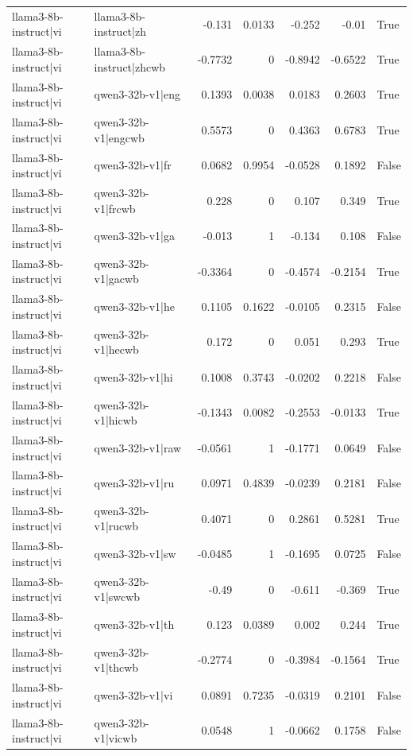 \begin{table}
\begin{tabular}{l l r r r r l}
llama3-8b-instruct|vi & llama3-8b-instruct|zh & -0.131 & 0.0133 & -0.252 & -0.01 & True \\
llama3-8b-instruct|vi & llama3-8b-instruct|zhcwb & -0.7732 & 0 & -0.8942 & -0.6522 & True \\
llama3-8b-instruct|vi & qwen3-32b-v1|eng & 0.1393 & 0.0038 & 0.0183 & 0.2603 & True \\
llama3-8b-instruct|vi & qwen3-32b-v1|engcwb & 0.5573 & 0 & 0.4363 & 0.6783 & True \\
llama3-8b-instruct|vi & qwen3-32b-v1|fr & 0.0682 & 0.9954 & -0.0528 & 0.1892 & False \\
llama3-8b-instruct|vi & qwen3-32b-v1|frcwb & 0.228 & 0 & 0.107 & 0.349 & True \\
llama3-8b-instruct|vi & qwen3-32b-v1|ga & -0.013 & 1 & -0.134 & 0.108 & False \\
llama3-8b-instruct|vi & qwen3-32b-v1|gacwb & -0.3364 & 0 & -0.4574 & -0.2154 & True \\
llama3-8b-instruct|vi & qwen3-32b-v1|he & 0.1105 & 0.1622 & -0.0105 & 0.2315 & False \\
llama3-8b-instruct|vi & qwen3-32b-v1|hecwb & 0.172 & 0 & 0.051 & 0.293 & True \\
llama3-8b-instruct|vi & qwen3-32b-v1|hi & 0.1008 & 0.3743 & -0.0202 & 0.2218 & False \\
llama3-8b-instruct|vi & qwen3-32b-v1|hicwb & -0.1343 & 0.0082 & -0.2553 & -0.0133 & True \\
llama3-8b-instruct|vi & qwen3-32b-v1|raw & -0.0561 & 1 & -0.1771 & 0.0649 & False \\
llama3-8b-instruct|vi & qwen3-32b-v1|ru & 0.0971 & 0.4839 & -0.0239 & 0.2181 & False \\
llama3-8b-instruct|vi & qwen3-32b-v1|rucwb & 0.4071 & 0 & 0.2861 & 0.5281 & True \\
llama3-8b-instruct|vi & qwen3-32b-v1|sw & -0.0485 & 1 & -0.1695 & 0.0725 & False \\
llama3-8b-instruct|vi & qwen3-32b-v1|swcwb & -0.49 & 0 & -0.611 & -0.369 & True \\
llama3-8b-instruct|vi & qwen3-32b-v1|th & 0.123 & 0.0389 & 0.002 & 0.244 & True \\
llama3-8b-instruct|vi & qwen3-32b-v1|thcwb & -0.2774 & 0 & -0.3984 & -0.1564 & True \\
llama3-8b-instruct|vi & qwen3-32b-v1|vi & 0.0891 & 0.7235 & -0.0319 & 0.2101 & False \\
llama3-8b-instruct|vi & qwen3-32b-v1|vicwb & 0.0548 & 1 & -0.0662 & 0.1758 & False \\

\end{tabular}
\end{table}
